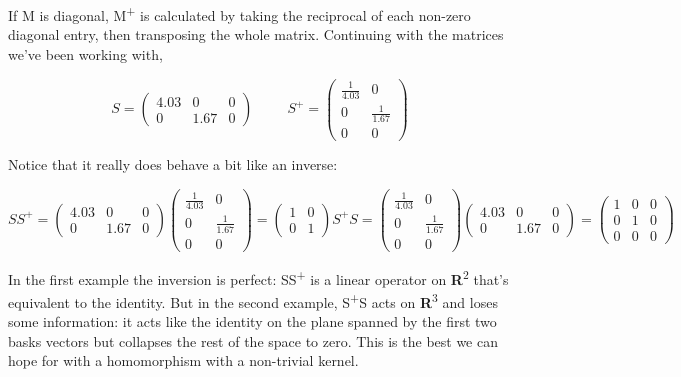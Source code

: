 \documentclass[oneside,english]{amsbook}
\numberwithin{section}{chapter}
\theoremstyle{plain}
\theoremstyle{definition}
\begin{document}
If M is diagonal, M\textsuperscript{+} is calculated by taking the
reciprocal of each non-zero diagonal entry, then transposing the whole
matrix. Continuing with the matrices we've been working with,

\[S = \begin{pmatrix}
	4.03 & 0 & 0 \\
	0 & 1.67 & 0
\end{pmatrix}\ \ \ \ \ \ \ \ \ \ \ S^{+} = \begin{pmatrix}
	\frac{1}{4.03} & 0 \\
	0 & \frac{1}{1.67} \\
	0 & 0
\end{pmatrix}\]

Notice that it really does behave a bit like an inverse:

\[{SS^{+} = \begin{pmatrix}
		4.03 & 0 & 0 \\
		0 & 1.67 & 0
	\end{pmatrix}\begin{pmatrix}
		\frac{1}{4.03} & 0 \\
		0 & \frac{1}{1.67} \\
		0 & 0
	\end{pmatrix} = \begin{pmatrix}
		1 & 0 \\
		0 & 1
	\end{pmatrix}
}{S^{+}S = \begin{pmatrix}
		\frac{1}{4.03} & 0 \\
		0 & \frac{1}{1.67} \\
		0 & 0
	\end{pmatrix}\begin{pmatrix}
		4.03 & 0 & 0 \\
		0 & 1.67 & 0
	\end{pmatrix} = \begin{pmatrix}
		1 & 0 & 0 \\
		0 & 1 & 0 \\
		0 & 0 & 0
\end{pmatrix}}\]

In the first example the inversion is perfect: SS\textsuperscript{+} is
a linear operator on \textbf{R}\textsuperscript{2} that's equivalent to
the identity. But in the second example, S\textsuperscript{+}S acts on
\textbf{R}\textsuperscript{3} and loses some information: it acts like
the identity on the plane spanned by the first two basks vectors but
collapses the rest of the space to zero. This is the best we can hope
for with a homomorphism with a non-trivial kernel.
\end{document}
